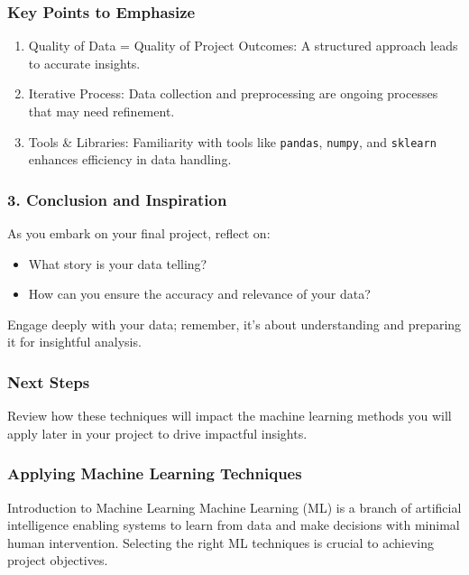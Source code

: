 \documentclass[aspectratio=169]{beamer}
\begin{document}
\begin{frame}[fragile]
    \frametitle{Key Points to Emphasize}
    \begin{enumerate}
        \item Quality of Data = Quality of Project Outcomes: A structured approach leads to accurate insights.
        \item Iterative Process: Data collection and preprocessing are ongoing processes that may need refinement.
        \item Tools & Libraries: Familiarity with tools like \texttt{pandas}, \texttt{numpy}, and \texttt{sklearn} enhances efficiency in data handling.
    \end{enumerate}
\end{frame}

\begin{frame}[fragile]
    \frametitle{3. Conclusion and Inspiration}
    As you embark on your final project, reflect on:
    \begin{itemize}
        \item What story is your data telling?
        \item How can you ensure the accuracy and relevance of your data?
    \end{itemize}
    Engage deeply with your data; remember, it's about understanding and preparing it for insightful analysis.
\end{frame}

\begin{frame}[fragile]
    \frametitle{Next Steps}
    Review how these techniques will impact the machine learning methods you will apply later in your project to drive impactful insights.
\end{frame}

\begin{frame}[fragile]
    \frametitle{Applying Machine Learning Techniques}
    \begin{block}{Introduction to Machine Learning}
        Machine Learning (ML) is a branch of artificial intelligence enabling systems to learn from data and make decisions with minimal human intervention. Selecting the right ML techniques is crucial to achieving project objectives.
    \end{block}
\end{frame}
\end{document}

